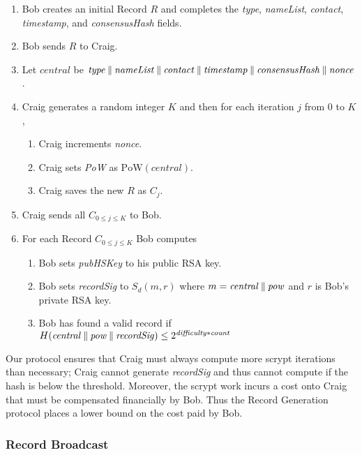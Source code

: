 \begin{enumerate}
	\item Bob creates an initial Record $ R $ and completes the \emph{type}, \emph{nameList}, \emph{contact}, \emph{timestamp}, and \emph{consensusHash} fields.
	\item Bob sends $ R $ to Craig.
	\item Let $ \mathit{central} $ be $\mathit{type} \mathbin{\|} \mathit{nameList} \mathbin{\|} \mathit{contact} \mathbin{\|} \mathit{timestamp} \mathbin{\|} \mathit{consensusHash} \mathbin{\|} \mathit{nonce} $.
	\item Craig generates a random integer $ K $ and then for each iteration $ j $ from 0 to $ K $,
		\begin{enumerate}
			\item Craig increments \emph{nonce}.
			\item Craig sets \emph{PoW} as $ \mathrm{PoW}(\mathit{central}) $.
			\item Craig saves the new $ R $ as $ C_{j} $.
		\end{enumerate}
	\item Craig sends all $ C_{0 \le j \le K} $ to Bob.
	\item For each Record $ C_{0 \le j \le K} $ Bob computes
		\begin{enumerate}
			\item Bob sets \emph{pubHSKey} to his public RSA key.
			\item Bob sets \emph{recordSig} to $ S_{d}(m, r) $ where $ m = \mathit{central} \mathbin{\|} \mathit{pow} $ and $ r $ is Bob's private RSA key.
			\item Bob has found a valid record if $ H(\mathit{central} \mathbin{\|} \mathit{pow} \mathbin{\|} \mathit{recordSig}) \leq 2^{\mathit{difficulty} * \mathit{count}} $
		\end{enumerate}
\end{enumerate}


Our protocol ensures that Craig must always compute more scrypt iterations than necessary; Craig cannot generate \emph{recordSig} and thus cannot compute if the hash is below the threshold. Moreover, the scrypt work incurs a cost onto Craig that must be compensated financially by Bob. Thus the Record Generation protocol places a lower bound on the cost paid by Bob.

\subsubsection{Record Broadcast}

